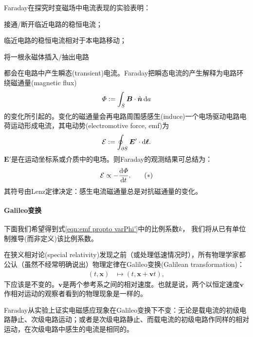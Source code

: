 Faraday在探究时变磁场中电流表现的实验表明：
\begin{compactenum}
    \item 接通/断开临近电路的稳恒电流；
    \item 临近电路的稳恒电流相对于本电路移动；
    \item 将一根永磁体插入/抽出电路
\end{compactenum}
都会在电路中产生瞬态(transient)电流。Faraday把瞬态电流的产生解释为电路环绕磁通量(magnetic flux)%
\begin{equation}
    \varPhi:=\int_S\bm B\cdot\mathop{}\!\hat{\bm{n}}\mathop{}\!\mathrm{d} a
\end{equation}
的变化所引起的。变化的磁通量会再电路周围感感生(induce)一个电场驱动电路电荷运动形成电流，其电动势(electromotive force, emf)为
\begin{equation}
    \mathcal{E}:=\oint_{\partial S}\bm E'\cdot\mathop{}\!\mathrm{d}\bm \ell.
\end{equation}
$\bm E'$是在运动坐标系或介质中的电场。则Faraday的观测结果可总结为：
\begin{equation}
    \label{eqn:emf propto varPhi'}
    \mathcal{E}\propto-\frac{\mathrm{d}^{{}}\varPhi}{\mathrm{d}{t}^{{}}}.
    \tag{$\ast$}
\end{equation}
其符号由Lenz定律决定：感生电流磁通量总是对抗磁通量的变化。

\paragraph{Galileo变换}

下面我们希望得到式\eqref{eqn:emf propto varPhi'}中的比例系数$k$，%
我们将从已有单位制推导(而非定义)该比例系数。

在狭义相对论(special relativity)发现之前（或处理低速情况时），所有物理学家都公认（虽然不经常明确说出）物理定律在Galileo变换(Galilean transformation)：
\begin{align*}
    (t,\bm x)&\mapsto(t,\bm x+\bm vt),
\end{align*}
下应该是不变的。$\bm v$是两个参考系之间的相对速度。也就是说，两个以恒定速度$\bm v$作相对运动的观察者看到的物理现象是一样的。%

Faraday从实验上证实电磁感应现象在Galileo变换下不变：无论是载电流的初级电路静止、次级电路运动；或者是次级电路静止、而载电流的初级电路作同样的相对运动，在次级电路中感生的电流是相同的。

